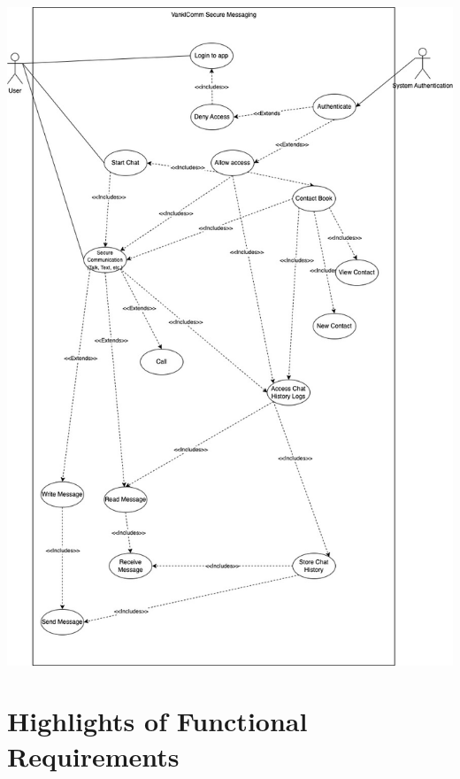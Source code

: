 \documentclass[]{article}
\begin{document}
\includegraphics[width=\paperwidth,height=0.75\paperheight,keepaspectratio]{UseCase.jpg}



%
%
%
\newpage
\section{Highlights of Functional Requirements}
\label{sec:functional_requirements}
\end{document}
